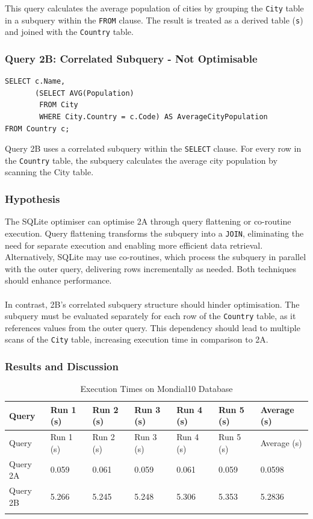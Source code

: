 \documentclass[11pt]{article}
\begin{document}
\noindent This query calculates the average population of cities by grouping the \texttt{City} table in a subquery within the \texttt{FROM} clause.
The result is treated as a derived table (\texttt{s}) and joined with the \texttt{Country} table. 

\subsubsection{Query 2B: Correlated Subquery - Not Optimisable}

\begin{verbatim}
SELECT c.Name, 
       (SELECT AVG(Population) 
        FROM City 
        WHERE City.Country = c.Code) AS AverageCityPopulation
FROM Country c;
\end{verbatim}

\noindent Query 2B uses a correlated subquery within the \texttt{SELECT} clause. For every row in the \texttt{Country} table, the subquery calculates
the average city population by scanning the City table. 

\subsubsection{Hypothesis}

The SQLite optimiser can optimise 2A through query flattening or co-routine execution. Query flattening transforms the subquery into a
\texttt{JOIN}, eliminating the need for separate execution and enabling more efficient data retrieval. Alternatively, SQLite may use co-routines, which
process the subquery in parallel with the outer query, delivering rows incrementally as needed. Both techniques should enhance performance.
\\ \\
In contrast, 2B's correlated subquery structure should hinder optimisation. The subquery must be evaluated separately for each row of the
\texttt{Country} table, as it references values from the outer query. This dependency should lead to multiple scans of the \texttt{City} table,
increasing execution time in comparison to 2A.

\subsubsection{Results and Discussion}

\begin{longtable}{|l|l|l|l|l|l|l|}
\hline
Query & Run 1 (s) & Run 2 (s) & Run 3 (s) & Run 4 (s) & Run 5 (s) & Average (s) \\
\hline
\endfirsthead
\hline
Query & Run 1 (s) & Run 2 (s) & Run 3 (s) & Run 4 (s) & Run 5 (s) & Average (s) \\
\hline
\endhead
Query 2A & 0.059 & 0.061 & 0.059 & 0.061 & 0.059 & 0.0598 \\
Query 2B & 5.266 & 5.245 & 5.248 & 5.306 & 5.353 & 5.2836 \\
\hline
\caption{Execution Times on Mondial10 Database}
\end{longtable}
\end{document}
